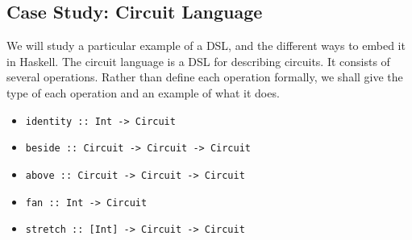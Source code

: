 \documentclass[a4paper,12pt]{article}
\theoremstyle{remark}
\begin{document}
  \subsection{Case Study: Circuit Language}

  We will study a particular example of a DSL, and the different ways to embed it
  in Haskell. The circuit language is a DSL for describing circuits. It consists of several
  operations. Rather than define each operation formally, we shall give the type of each
  operation and an example of what it does.


  \begin{itemize}
    \item \lstinline{identity :: Int -> Circuit}

    \begin{figure}[H]
      \centering
    \end{figure}

    \item \lstinline{beside :: Circuit -> Circuit -> Circuit}

    \begin{figure}[H]
      \centering
    \end{figure}

    \item \lstinline{above :: Circuit -> Circuit -> Circuit}

    \begin{figure}[H]
      \centering
    \end{figure}

    \item \lstinline{fan :: Int -> Circuit}

    \begin{figure}[H]
      \centering
    \end{figure}

    \item \lstinline{stretch :: [Int] -> Circuit -> Circuit}

    \begin{figure}[H]
      \centering
    \end{figure}

  \end{itemize}
\end{document}
